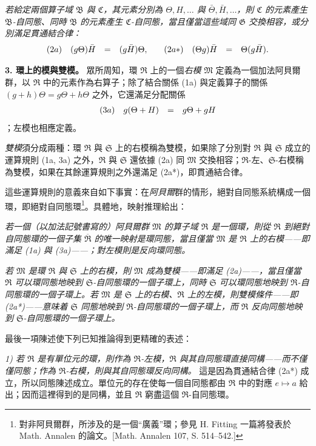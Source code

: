 \documentclass[11pt]{article}
\providecommand{\frR}{\mathfrak R}
\providecommand{\frS}{\mathfrak S}
\providecommand{\frM}{\mathfrak M}
\providecommand{\frB}{\mathfrak B}
\providecommand{\frC}{\mathfrak C}
\providecommand{\frG}{\mathfrak G}
\begin{document}
\emph{若給定兩個算子域 \(\frB\) 與 \(\frC\)，其元素分別為 \(\Theta,H,\ldots\) 與 \(\bar\Theta,\bar H,\ldots\)，則 \(\frC\) 的元素產生 \(\frB\)-自同態、同時 \(\frB\) 的元素產生 \(\frC\)-自同態，當且僅當這些域同 \(\frG\) 交換相容，或分別滿足貫通結合律：}
\[
        \begin{array}{r@{\quad}c@{\quad}c@{\quad}c@{\qquad}r@{\quad}c@{\quad}c@{\quad}c}
        (2a) & (g\Theta)\bar H &=& (g\bar H)\Theta, &
        (2a*) & (\Theta g)\bar H &=& \Theta(g\bar H).
        \end{array}
\]

\noindent\textbf{3. 環上的模與雙模。} 眾所周知，環 \(\frR\) 上的一個\emph{右模} \(\frM\) 定義為一個加法阿貝爾群，以 \(\frR\) 中的元素作為右算子；除了結合關係 (1a) 與定義算子的關係 \((g+h)\Theta=g\Theta+h\Theta\) 之外，它還滿足分配關係
\[
        \begin{array}{r@{\quad}c@{\quad}c@{\quad}c}
        (3a) & g(\Theta+H) &=& g\Theta+gH
        \end{array}
\]
；左模也相應定義。

\emph{雙模}須分成兩種：環 \(\frR\) 與 \(\frS\) 上的右模稱為雙模，如果除了分別對 \(\frR\) 與 \(\frS\) 成立的運算規則 (1a, 3a) 之外，\(\frR\) 與 \(\frS\) 還依據 (2a) 同 \(\frM\) 交換相容；\(\frR\)-左、\(\frS\)-右模稱為雙模，如果在其餘運算規則之外還滿足 (2a*)，即貫通結合律。

這些運算規則的意義來自如下事實：在\emph{阿貝爾}群的情形，絕對自同態系統構成一個環，即絕對自同態環\footnote{對非阿貝爾群，所涉及的是一個“廣義”環；參見 H. Fitting 一篇將發表於 Math. Annalen 的論文。[Math. Annalen 107, S. 514--542.] }。具體地，映射推理給出：

\emph{若一個（以加法記號書寫的）阿貝爾群 \(\frM\) 的算子域 \(\frR\) 是一個環，則從 \(\frR\) 到絕對自同態環的一個子集 \(\overline{\frR}\) 的唯一映射是環同態，當且僅當 \(\frM\) 是 \(\frR\) 上的右模——即滿足 (1a) 與 (3a)——；對左模則是反向環同態。}

\emph{若 \(\frM\) 是環 \(\frR\) 與 \(\frS\) 上的右模，則 \(\frM\) 成為雙模——即滿足 (2a)——，當且僅當 \(\frR\) 可以環同態地映到 \(\frS\)-自同態環的一個子環上，同時 \(\frS\) 可以環同態地映到 \(\frR\)-自同態環的一個子環上。若 \(\frM\) 是 \(\frS\) 上的右模、\(\frR\) 上的左模，則雙模條件——即 (2a*)——意味着 \(\frS\) 同態地映到 \(\frR\)-自同態環的一個子環上，而 \(\frR\) 反向同態地映到 \(\frS\)-自同態環的一個子環上。}

最後一項陳述使下列已知推論得到更精確的表述：

\emph{1) 若 \(\frR\) 是有單位元的環，則作為 \(\frR\)-左模，\(\frR\) 與其自同態環直接同構——而不僅僅同態；作為 \(\frR\)-右模，則與其自同態環反向同構。} 這是因為貫通結合律 (2a*) 成立，所以同態陳述成立。單位元的存在使每一個自同態都由 \(\frR\) 中的對應 \(e\mapsto a\) 給出；因而這裡得到的是同構，並且 \(\frR\) 窮盡這個 \(\frR\)-自同態環。
\end{document}
